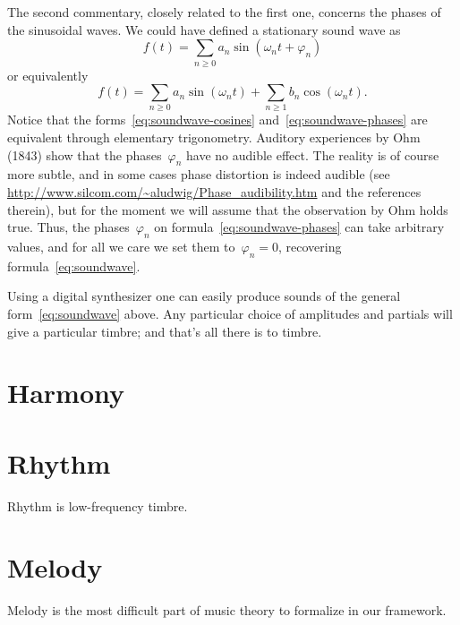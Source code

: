 The second commentary, closely related to the first one, concerns the phases of
the sinusoidal waves.  We could have defined a stationary sound wave as
\begin{equation}\label{eq:soundwave-phases}
	f(t)=\sum_{n\ge 0}a_n\sin(\omega_nt+\varphi_n)
\end{equation}
or equivalently
\begin{equation}\label{eq:soundwave-cosines}
	f(t)=
	\sum_{n\ge 0}a_n\sin(\omega_nt)
	+\sum_{n\ge 1}b_n\cos(\omega_nt).
\end{equation}
Notice that the forms~\ref{eq:soundwave-cosines}
and~\ref{eq:soundwave-phases} are equivalent through elementary trigonometry.
Auditory experiences by Ohm (1843) show that the phases~$\varphi_n$
have no audible effect.  The reality is of course more subtle, and in some
cases phase distortion is indeed audible (see
\url{http://www.silcom.com/~aludwig/Phase_audibility.htm} and the references
therein), but for the moment we will assume that the observation by Ohm holds
true.  Thus, the phases~$\varphi_n$ on formula~\ref{eq:soundwave-phases} can
take arbitrary values, and for all we care we set them to~$\varphi_n=0$,
recovering formula~\ref{eq:soundwave}.

Using a digital synthesizer one can easily produce sounds of the general
form~\ref{eq:soundwave} above.  Any particular choice of amplitudes and
partials will give a particular timbre; and that's all there is to timbre.









\section{Harmony}






% 

\section{Rhythm}

Rhythm is low-frequency timbre.


\section{Melody}

Melody is the most difficult part of music theory to formalize in our
framework.



